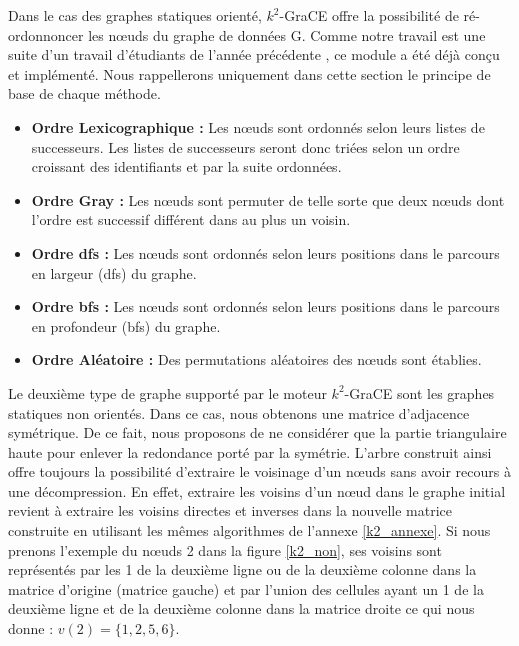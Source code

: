 \documentclass[a4paper,oneside,12pt]{report}
\theoremstyle{definition}
\begin{document}
			
			Dans le cas des graphes statiques orienté, $k^2$-GraCE offre la possibilité de ré-ordonnoncer les nœuds du graphe de données G.
			Comme notre travail est une suite d'un travail d'étudiants de l'année précédente \citep{master2017}, ce module a été déjà conçu et implémenté. Nous rappellerons uniquement dans cette section le principe de base de chaque méthode. 
			
			\begin{itemize}[label=$\bullet$]
\item\textbf{Ordre Lexicographique :} Les nœuds sont ordonnés selon leurs listes de successeurs. Les listes de successeurs seront donc triées selon un ordre croissant des identifiants et par la suite ordonnées.

	
\item\textbf{Ordre Gray :} Les nœuds sont permuter de telle sorte que deux nœuds dont l'ordre est successif différent dans au plus un voisin. 
\item\textbf{Ordre \gls{dfs} :} Les nœuds sont ordonnés selon leurs positions dans le parcours en largeur (\gls{dfs}) du graphe.  
\item\textbf{Ordre \gls{bfs} :} Les nœuds sont ordonnés selon leurs positions dans le parcours en profondeur (\gls{bfs}) du graphe. 
\item\textbf{Ordre Aléatoire :} Des permutations aléatoires des nœuds sont établies.
			
			\end{itemize}
		
	Le deuxième type de graphe supporté par le moteur $k^2$-GraCE sont les graphes statiques non orientés. Dans ce cas, nous obtenons une matrice d'adjacence symétrique. De ce fait, nous proposons de ne considérer que la partie triangulaire haute pour enlever la redondance porté par la symétrie. L'arbre construit ainsi offre toujours la possibilité d'extraire le voisinage d'un nœuds sans avoir recours à une décompression. En effet, extraire les voisins d'un nœud dans le graphe initial revient à extraire les voisins directes et inverses dans la nouvelle matrice construite en utilisant les mêmes algorithmes de l'annexe \ref{k2_annexe}.
	 Si nous prenons l'exemple du nœuds 2 dans la figure \ref{k2_non}, ses voisins sont représentés par les 1 de la deuxième ligne ou de la deuxième colonne dans la matrice d'origine (matrice gauche) et par l'union des cellules ayant un 1 de la deuxième ligne et de la deuxième colonne dans la matrice droite ce qui nous donne : $v(2) = \{1, 2, 5,6\}$.
	
\end{document}
